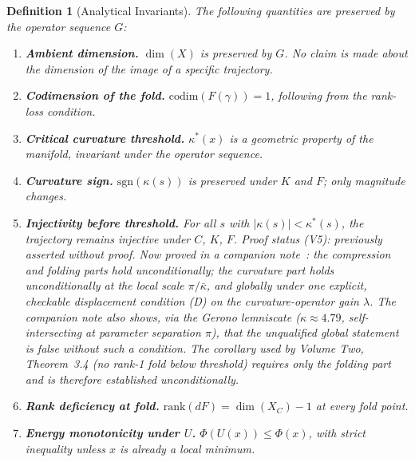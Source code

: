 \documentclass[14pt,a4paper]{extarticle}
\newtheorem{definition}{Definition}[section]
\begin{document}
\begin{definition}[Analytical Invariants]
The following quantities are preserved by the operator sequence $G$:

\begin{enumerate}[label=\textbf{I\arabic*.},leftmargin=3em]
  \item \textbf{Ambient dimension.}
    $\dim(X)$ is preserved by $G$.
    No claim is made about the dimension of the image of a specific
    trajectory.

  \item \textbf{Codimension of the fold.}
    $\mathrm{codim}(F(\gamma)) = 1$, following from the rank-loss
    condition.

  \item \textbf{Critical curvature threshold.}
    $\kappa^*(x)$ is a geometric property of the manifold, invariant
    under the operator sequence.

  \item \textbf{Curvature sign.}
    $\mathrm{sgn}(\kappa(s))$ is preserved under $K$ and $F$; only
    magnitude changes.

  \item \textbf{Injectivity before threshold.}
    For all $s$ with $|\kappa(s)| < \kappa^*(s)$, the trajectory
    remains injective under $C$, $K$, $F$.
    \emph{Proof status (V5):} previously asserted without proof. Now
    proved in a companion note~\cite{GrossiInv75}: the compression
    and folding parts hold unconditionally; the curvature part holds
    unconditionally at the local scale $\pi/\bar\kappa$, and globally
    under one explicit, checkable displacement condition (D) on the
    curvature-operator gain $\lambda$. The companion note also shows,
    via the Gerono lemniscate ($\kappa\!\approx\!4.79$, self-intersecting
    at parameter separation $\pi$), that the unqualified \emph{global}
    statement is false without such a condition. The corollary used by
    Volume Two, Theorem~3.4 (no rank-1 fold below threshold) requires
    only the folding part and is therefore established unconditionally.

  \item \textbf{Rank deficiency at fold.}
    $\mathrm{rank}(dF) = \dim(X_C) - 1$ at every fold point.

  \item \textbf{Energy monotonicity under $U$.}
    $\Phi(U(x)) \leq \Phi(x)$, with strict inequality unless $x$ is
    already a local minimum.
\end{enumerate}
\end{definition}
\end{document}
